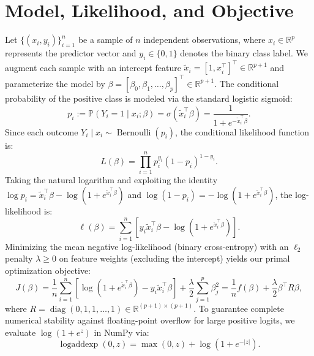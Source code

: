 \documentclass[11pt,a4paper]{article}
\theoremstyle{remark}\newtheorem{remark}{Remark}
\begin{document}
\section{Model, Likelihood, and Objective}
Let $\{(x_i, y_i)\}_{i=1}^n$ be a sample of $n$ independent observations, where $x_i \in \mathbb{R}^p$ represents the predictor vector and $y_i \in \{0, 1\}$ denotes the binary class label. We augment each sample with an intercept feature $\tilde{x}_i = [1, x_i^\top]^\top \in \mathbb{R}^{p+1}$ and parameterize the model by $\beta = [\beta_0, \beta_1, \dots, \beta_p]^\top \in \mathbb{R}^{p+1}$. The conditional probability of the positive class is modeled via the standard logistic sigmoid:
\begin{equation}
  p_i := \mathbb{P}(Y_i = 1 \mid x_i; \beta) = \sigma(\tilde{x}_i^\top \beta) = \frac{1}{1 + e^{-\tilde{x}_i^\top \beta}}.
\end{equation}
Since each outcome $Y_i \mid x_i \sim \operatorname{Bernoulli}(p_i)$, the conditional likelihood function is:
\begin{equation}
  L(\beta) = \prod_{i=1}^n p_i^{y_i} (1 - p_i)^{1 - y_i}.
\end{equation}
Taking the natural logarithm and exploiting the identity $\log p_i = \tilde{x}_i^\top \beta - \log(1 + e^{\tilde{x}_i^\top \beta})$ and $\log(1 - p_i) = -\log(1 + e^{\tilde{x}_i^\top \beta})$, the log-likelihood is:
\begin{equation}
  \ell(\beta) = \sum_{i=1}^n \left[ y_i \tilde{x}_i^\top \beta - \log\left(1 + e^{\tilde{x}_i^\top \beta}\right) \right].
\end{equation}
Minimizing the mean negative log-likelihood (binary cross-entropy) with an $\ell_2$ penalty $\lambda \ge 0$ on feature weights (excluding the intercept) yields our primal optimization objective:
\begin{equation}\label{eq:objective}
  J(\beta) = \frac{1}{n} \sum_{i=1}^n \left[ \log\left(1 + e^{\tilde{x}_i^\top \beta}\right) - y_i \tilde{x}_i^\top \beta \right] + \frac{\lambda}{2} \sum_{j=1}^p \beta_j^2 = \frac{1}{n} f(\beta) + \frac{\lambda}{2} \beta^\top R \beta,
\end{equation}
where $R = \operatorname{diag}(0, 1, 1, \dots, 1) \in \mathbb{R}^{(p+1)\times(p+1)}$. To guarantee complete numerical stability against floating-point overflow for large positive logits, we evaluate $\log(1 + e^z)$ in NumPy via:
\begin{equation}
  \operatorname{logaddexp}(0, z) = \max(0, z) + \log\left(1 + e^{-|z|}\right).
\end{equation}
\end{document}

